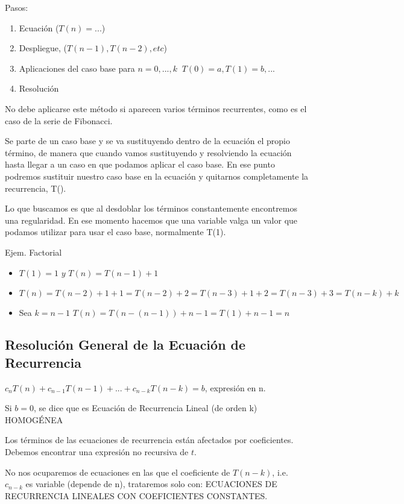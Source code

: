Pasos:
\begin{enumerate}
	\item Ecuación ($T(n)=...$)
	\item Despliegue, ($T(n-1), T(n-2), etc$)
	\item Aplicaciones del caso base para $n=0, ..., k\;\; T(0)=a, T(1)=b, ...$
	\item Resolución
\end{enumerate}

No debe aplicarse este método si aparecen varios términos recurrentes, como es el caso de la serie de Fibonacci.

Se parte de un caso base y se va sustituyendo dentro de la ecuación el propio término, de manera que cuando vamos sustituyendo y resolviendo la ecuación hasta llegar a un caso en que podamos aplicar el caso base. En ese punto podremos sustituir nuestro caso base en la ecuación y quitarnos completamente la recurrencia, T().

Lo que buscamos es que al desdoblar los términos constantemente encontremos una regularidad. En ese momento hacemos que una variable valga un valor que podamos utilizar para usar el caso base, normalmente T(1).

Ejem. Factorial
\begin{itemize}
	\item $T(1) = 1 \textit{ y } T(n) = T(n-1)+1$
	\item $T(n) = T(n-2)+1+1=T(n-2)+2=T(n-3)+1+2=T(n-3)+3=T(n-k)+k$
	\item Sea $k=n-1$ $T(n)=T(n-(n-1))+n-1=T(1)+n-1=n$
\end{itemize}

\subsection{Resolución General de la Ecuación de Recurrencia}
$c_nT(n)+c_{n-1}T(n-1)+...+c_{n-k}T(n-k)=b$, expresión en n.

Si $b=0$, se dice que es Ecuación de Recurrencia Lineal (de orden k) HOMOGÉNEA

Los términos de las ecuaciones de recurrencia están afectados por coeficientes. Debemos encontrar una expresión no recursiva de $t$.

No nos ocuparemos de ecuaciones en las que el coeficiente de $T(n-k)$, i.e. $c_{n-k}$ es variable (depende de n), trataremos solo con: ECUACIONES DE RECURRENCIA LINEALES CON COEFICIENTES CONSTANTES.

